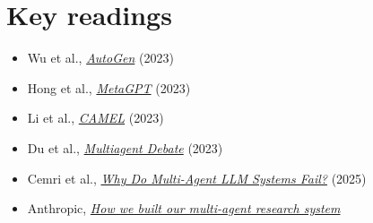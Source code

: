 \documentclass[10pt,oneside]{report}
\begin{document}
\section{Key readings}
\begin{itemize}
\item Wu et al., \href{https://arxiv.org/abs/2308.08155}{\emph{AutoGen}} (2023)
\item Hong et al., \href{https://arxiv.org/abs/2308.00352}{\emph{MetaGPT}} (2023)
\item Li et al., \href{https://arxiv.org/abs/2303.17760}{\emph{CAMEL}} (2023)
\item Du et al., \href{https://arxiv.org/abs/2305.14325}{\emph{Multiagent Debate}} (2023)
\item Cemri et al., \href{https://arxiv.org/abs/2503.13657}{\emph{Why Do Multi-Agent LLM Systems Fail?}} (2025)
\item Anthropic, \href{https://www.anthropic.com/engineering/multi-agent-research-system}{\emph{How we built our multi-agent research system}}
\end{itemize}
\end{document}
